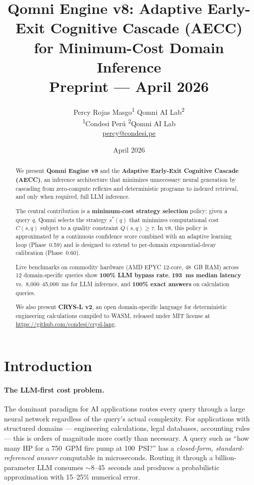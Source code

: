 \documentclass[12pt,a4paper]{article}
\title{\textbf{Qomni Engine v8: Adaptive Early-Exit Cognitive Cascade (AECC)\\
for Minimum-Cost Domain Inference}\\
\large Preprint --- April 2026}
\author{
  Percy Rojas Masgo\textsuperscript{1} \quad Qomni AI Lab\textsuperscript{2}\\[0.3em]
  \textsuperscript{1}Condesi Per\'u \quad
  \textsuperscript{2}Qomni AI Lab\\
  \href{mailto:percy@condesi.pe}{percy@condesi.pe}
}
\date{April 2026}
\begin{document}
\maketitle

\begin{abstract}
We present \textbf{Qomni Engine v8} and the \textbf{Adaptive Early-Exit
Cognitive Cascade (AECC)}, an inference architecture that minimizes unnecessary
neural generation by cascading from zero-compute reflexes and deterministic
programs to indexed retrieval, and only when required, full LLM inference.

The central contribution is a \textbf{minimum-cost strategy selection} policy:
given a query $q$, Qomni selects the strategy $s^*(q)$ that minimizes
computational cost $C(s,q)$ subject to a quality constraint $Q(s,q) \geq \tau$.
In v8, this policy is approximated by a continuous confidence score
combined with an adaptive learning loop (Phase~0.59) and is designed to
extend to per-domain exponential-decay calibration (Phase~0.60).

Live benchmarks on commodity hardware (AMD EPYC 12-core, 48~GB RAM) across
12 domain-specific queries show \textbf{100\% LLM bypass rate}, \textbf{193~ms
median latency} vs.\ 8,000--45,000~ms for LLM inference, and
\textbf{100\% exact answers} on calculation queries.

We also present \textbf{CRYS-L v2}, an open domain-specific language for
deterministic engineering calculations compiled to WASM, released under
MIT license at \url{https://github.com/condesi/crysl-lang}.
\end{abstract}

\tableofcontents
\newpage

\section{Introduction}
\label{sec:intro}

\paragraph{The LLM-first cost problem.}
The dominant paradigm for AI applications routes every query through a large
neural network regardless of the query's actual complexity. For
applications with structured domains --- engineering calculations, legal
databases, accounting rules --- this is orders of magnitude more costly than
necessary. A query such as ``how many HP for a 750~GPM fire pump at 100~PSI?''
has a \emph{closed-form, standard-referenced answer} computable in microseconds.
Routing it through a billion-parameter LLM consumes $\sim$8--45~seconds and
produces a probabilistic approximation with 15--25\% numerical error.
\end{document}
